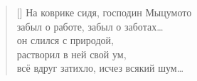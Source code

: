 \documentclass[a5paper,11pt]{memoir}
\newcommand{\blurry}[2]{
\foreach \a in {0,5,...,360}
{   \foreach \r in {0,.1,...,1}
    {   \draw [black, opacity=0.02] node at (\a:\r ex) {#1};
    }
}
\draw [#2, opacity=1.0] node at (0,0) {#1};
}
\begin{document}


\begin{verse}[\versewidth]
На коврике сидя, господин Мыцумото\\ 
забыл о работе, забыл о заботах\ldots \\
он слился с природой, \\
растворил в ней свой ум,\\ 
всё вдруг затихло, исчез всякий шум\ldots
\end{verse}



\end{document}
